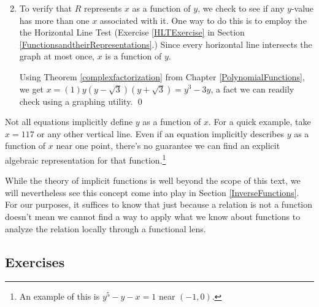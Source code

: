 \documentclass{ximera}
\begin{document}
\begin{example}
\begin{enumerate}
\begin{center}
\begin{multicols}{3}
\end{multicols}
\end{center}

\item  To verify that $R$ represents $x$ as a function of $y$, we check to see if any $y$-value has more than one $x$ associated with it.  One way to do this is to employ the the Horizontal Line Test (Exercise \ref{HLTExercise} in Section \ref{FunctionsandtheirRepresentations}.)  Since every horizontal line intersects the graph at most once, $x$ is a function of $y$.  

\smallskip

Using Theorem \ref{complexfactorization} from Chapter \ref{PolynomialFunctions}, we get $x = (1)y(y-\sqrt{3})(y+\sqrt{3}) = y^3 - 3y$, a fact we can readily check using a graphing utility.  \qed

\end{enumerate}

\end{example}

\enlargethispage{0.25in}

Not all equations implicitly define $y$ as a function of $x$.  For a quick example,  take $x = 117$ or any other vertical line.  Even if an equation implicitly describes $y$ as a function of $x$ near one point, there's no guarantee we can find an explicit algebraic representation for that function.\footnote{An example of this is $y^5-y-x = 1$ near $(-1,0)$.}   

\smallskip

While the theory of implicit functions is well beyond the scope of this text, we will nevertheless see this concept come into play in Section \ref{InverseFunctions}.  For our purposes, it suffices to know that just because a relation is not a function doesn't mean we cannot find a way to apply what we know about functions to analyze the relation locally through a functional lens.  

\newpage

\subsection{Exercises}


\closegraphsfile
\end{document}
